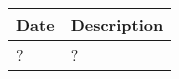 \begin{center}
    {\renewcommand{\arraystretch}{2}%
    \begin{tabular}{L{2cm}L{12cm}}
        \hline
        \textbf{Date} & \textbf{Description} \\
        \hline
        ? & ? \\
        \hline
    \end{tabular}}
\end{center}